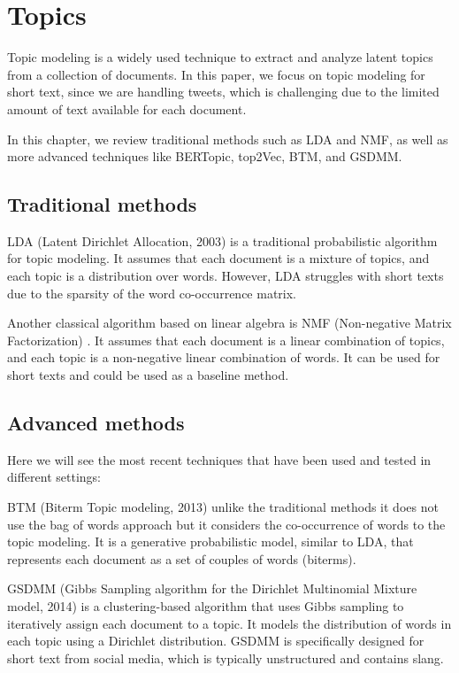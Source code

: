 \section[Topics]{Topics}
Topic modeling is a widely used technique to extract and analyze latent topics from a collection of documents. In this paper, we focus on topic modeling for short text, since we are handling tweets, which is challenging due to the limited amount of text available for each document. 

In this chapter, we review traditional methods such as LDA and NMF, as well as more advanced techniques like BERTopic, top2Vec, BTM, and GSDMM. 

\subsection{Traditional methods}
LDA (Latent Dirichlet Allocation, 2003)\cite{blei_latent_2003} is a traditional probabilistic algorithm for topic modeling. It assumes that each document is a mixture of topics, and each topic is a distribution over words. However, LDA struggles with short texts due to the sparsity of the word co-occurrence matrix.

Another classical algorithm based on linear algebra is NMF (Non-negative Matrix Factorization) \cite{lee_algorithms_2000}\cite{kuang_nonnegative_2015}. It assumes that each document is a linear combination of topics, and each topic is a non-negative linear combination of words. It can be used for short texts and could be used as a baseline method.

\subsection{Advanced methods}
Here we will see the most recent techniques that have been used and tested in different settings:

BTM (Biterm Topic modeling, 2013) \cite{yan_biterm_2013} unlike the traditional methods it does not use the bag of words approach but it considers the co-occurrence of words to the topic modeling. It is a generative probabilistic model, similar to LDA, that represents each document as a set of couples of words (biterms).

GSDMM (Gibbs Sampling algorithm for the Dirichlet Multinomial Mixture model, 2014) \cite{yin_dirichlet_2014} is a clustering-based algorithm that uses Gibbs sampling to iteratively assign each document to a topic. It models the distribution of words in each topic using a Dirichlet distribution. GSDMM is specifically designed for short text from social media, which is typically unstructured and contains slang.

